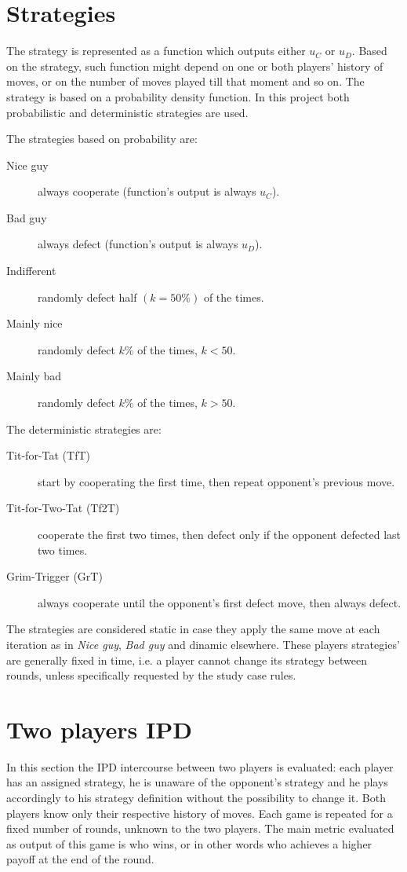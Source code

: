 \documentclass[journal,a4paper,10pt,twoside]{IEEEtran} %
\begin{document}
\section{Strategies} \label{s:str}
The strategy is represented as a function which outputs either $u_C$ or $u_D$. Based on the strategy, such function might depend on one or both players' history of moves, or on the number of moves played till that moment and so on.
The strategy is based on a probability density function. In this project both probabilistic and deterministic strategies are used.

The strategies based on probability are:
\begin{description}
    \item[Nice guy] always cooperate (function's output is always $u_C$).
    \item[Bad guy] always defect (function's output is always $u_D$).
    \item[Indifferent] randomly defect half $(k=50\%)$ of the times.
    \item[Mainly nice] randomly defect $k\%$ of the times, $k<50$.%
    \item[Mainly bad] randomly defect $k\%$ of the times, $k>50$.%
\end{description}

The deterministic strategies are:
\begin{description}
    \item[Tit-for-Tat (TfT)] start by cooperating the first time, then repeat opponent's previous move.
    \item[Tit-for-Two-Tat (Tf2T)] cooperate the first two times, then defect only if the opponent defected last two times.
    \item[Grim-Trigger (GrT)] always cooperate until the opponent's first defect move, then always defect. 
\end{description}

The strategies are considered static in case they apply the same move at each iteration as in \textit{Nice guy}, \textit{Bad guy} and dinamic elsewhere.
These players strategies' are generally fixed in time, i.e. a player cannot change its strategy between rounds, unless specifically requested by the study case rules.%

\section{Two players IPD} \label{s:IPD2P}
In this section the IPD intercourse between two players is evaluated: each player has an assigned strategy, he is unaware of the opponent's strategy and he plays accordingly to his strategy definition without the possibility to change it. Both players know only their respective history of moves. Each game is repeated for a fixed number of rounds, unknown to the two players. The main metric evaluated as output of this game is who wins, or in other words who achieves a higher payoff at the end of the round.
\end{document}
